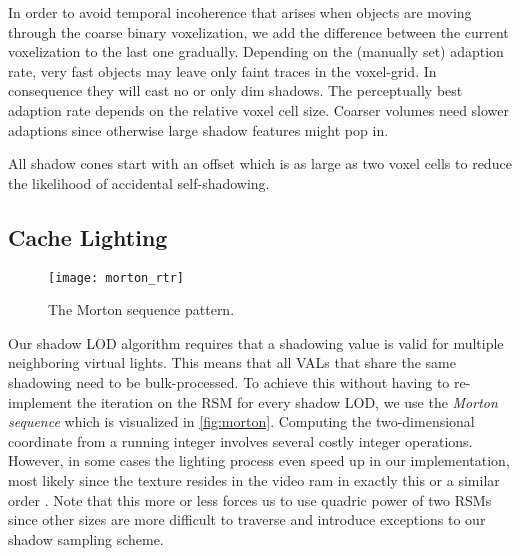 \documentclass[thesis.tex]{subfiles}
\begin{document}
In order to avoid temporal incoherence that arises when objects are moving through the coarse binary voxelization, we add the difference between the current voxelization to the last one gradually.
Depending on the (manually set) adaption rate, very fast objects may leave only faint traces in the voxel-grid.
In consequence they will cast no or only dim shadows.
The perceptually best adaption rate depends on the relative voxel cell size.
Coarser volumes need slower adaptions since otherwise large shadow features might pop in.

All shadow cones start with an offset which is as large as two voxel cells to reduce the likelihood of accidental self-shadowing. 

\subsection{Cache Lighting} \label{sec:impl:details:lighting}
\begin{figure}[h]
\centering
\texttt{[image: morton\_rtr]}
\caption{\cite[p.848]{bib:RealtimeRenderingBook} The Morton sequence pattern. } \label{fig:morton}
\end{figure}
Our shadow LOD algorithm requires that a shadowing value is valid for multiple neighboring virtual lights.
This means that all VALs that share the same shadowing need to be bulk-processed.
To achieve this without having to re-implement the iteration on the RSM for every shadow LOD, we use the \emph{Morton sequence} \cite{bib:mortonorder} which is visualized in \autoref{fig:morton}.
Computing the two-dimensional coordinate from a running integer involves several costly integer operations.
However, in some cases the lighting process even speed up in our implementation, most likely since the texture resides in the video ram in exactly this or a similar order \cite[p.848]{bib:RealtimeRenderingBook}.
Note that this more or less forces us to use quadric power of two RSMs since other sizes are more difficult to traverse and introduce exceptions to our shadow sampling scheme.
\end{document}
